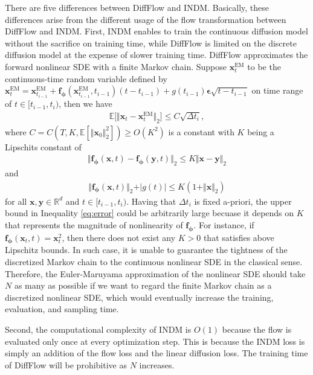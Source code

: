 \documentclass{article}
\theoremstyle{definition}
\theoremstyle{remark}
\begin{document}
	There are five differences between DiffFlow and INDM. Basically, these differences arise from the different usage of the flow transformation between DiffFlow and INDM. First, INDM enables to train the continuous diffusion model without the sacrifice on training time, while DiffFlow is limited on the discrete diffusion model at the expense of slower training time. DiffFlow approximates the forward nonlinear SDE with a finite Markov chain. Suppose $\mathbf{x}_{t}^{\text{EM}}$ to be the continuous-time random variable defined by $\mathbf{x}_{t}^{\text{EM}}=\mathbf{x}_{t_{i-1}}^{\text{EM}}+\mathbf{f}_{\bm{\phi}}(\mathbf{x}_{t_{i-1}}^{\text{EM}},t_{i-1})(t-t_{i-1})+g(t_{i-1})\bm{\epsilon}\sqrt{t-t_{i-1}}$ on time range of $t\in [t_{i-1},t_{i})$, then we have
	\begin{align}\label{eq:error}
	\mathbb{E}\big[\Vert\mathbf{x}_{t}-\mathbf{x}_{t}^{\text{EM}}\Vert_{2}\big]\le C\sqrt{\Delta t_{i}},
	\end{align}
	where $C=C(T, K, \mathbb{E}[\Vert\mathbf{x}_{0}\Vert_{2}^{2}])\ge O(K^{2})$ is a constant with $K$ being a Lipschits constant of
	\begin{align*}
	\Vert\mathbf{f}_{\bm{\phi}}(\mathbf{x},t)-\mathbf{f}_{\bm{\phi}}(\mathbf{y},t)\Vert_{2}\le K\Vert\mathbf{x}-\mathbf{y}\Vert_{2}
	\end{align*}
	and
	\begin{align*}
	\Vert\mathbf{f}_{\bm{\phi}}(\mathbf{x},t)\Vert_{2}+\vert g(t)\vert\le K(1+\Vert\mathbf{x}\Vert_{2})
	\end{align*}
	for all $\mathbf{x},\mathbf{y}\in\mathbb{R}^{d}$ and $t\in[t_{i-1},t_{i})$. Having that $\Delta t_{i}$ is fixed a-priori, the upper bound in Inequality \eqref{eq:error} could be arbitrarily large becuase it depends on $K$ that represents the magnitude of nonlinearity of $\mathbf{f}_{\bm{\phi}}$. For instance, if $\mathbf{f}_{\bm{\phi}}(\mathbf{x}_{t},t)=\mathbf{x}_{t}^{2}$, then there does not exist any $K>0$ that satisfies above Lipschitz bounds. In such case, it is unable to guarantee the tightness of the discretized Markov chain to the continuous nonlinear SDE in the classical sense. Therefore, the Euler-Maruyama approximation of the nonlinear SDE should take $N$ as many as possible if we want to regard the finite Markov chain as a discretized nonlinear SDE, which would eventually increase the training, evaluation, and sampling time.
	
	Second, the computational complexity of INDM is $O(1)$ because the flow is evaluated only once at every optimization step. This is because the INDM loss is simply an addition of the flow loss and the linear diffusion loss. The training time of DiffFlow will be prohibitive as $N$ increases.
	
\end{document}
